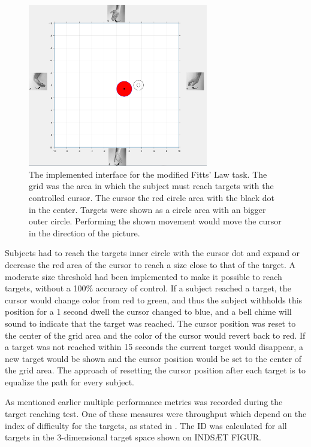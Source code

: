 \begin{figure}[H] 
	\includegraphics[width=0.7\textwidth]{figures/xBackground/perftestGUI}
	\caption{The implemented interface for the modified Fitts' Law task. The grid was the area in which the subject must reach targets with the controlled cursor. The cursor  the red circle area with the black dot in the center. Targets were shown as a circle area with an bigger outer circle. Performing the shown movement would move the cursor in the direction of the picture.}
	\label{fig:fittsLawTask}
\end{figure}

Subjects had to reach the targets inner circle with the cursor dot and expand or decrease the red area of the cursor to reach a size close to that of the target. A moderate size threshold had been implemented to make it possible to reach targets, without a 100\% accuracy of control. If a subject reached a target, the cursor would change color from red to green, and thus the subject withholds this position for a 1 second dwell the cursor changed to blue, and a bell chime will sound to indicate that the target was reached. The cursor position was reset to the center of the grid area and the color of the cursor would revert back to red. If a target was not reached within 15 seconds the current target would disappear, a new target would be shown and the cursor position would be set to the center of the grid area. The approach of resetting the cursor position after each target is to equalize the path for every subject. 

As mentioned earlier multiple performance metrics was recorded during the target reaching test. One of these measures were throughput which depend on the index of difficulty for the targets, as stated in . The ID was calculated for all targets in the 3-dimensional target space shown on INDSÆT FIGUR. 



